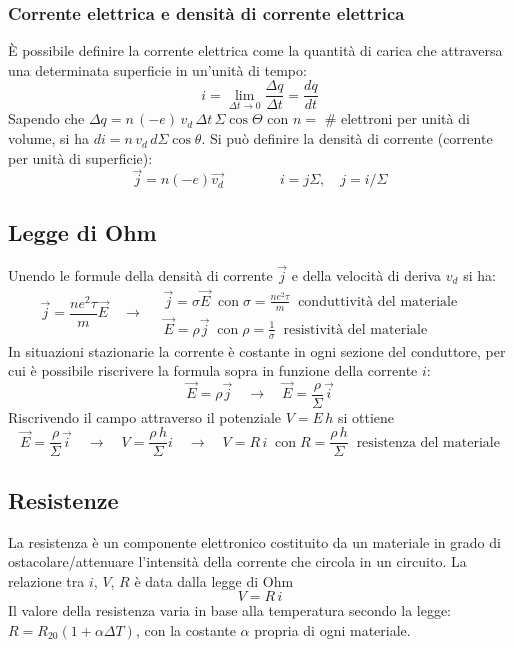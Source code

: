 \documentclass[a4paper]{article}
\begin{document}
\subsubsection*{Corrente elettrica e densità di corrente elettrica}
È possibile definire la corrente elettrica come la quantità di carica che attraversa una determinata superficie in un'unità di tempo:
\[i = \lim_{\Delta t \to 0} \frac{\Delta q}{\Delta t} = \frac{dq}{dt}\]
Sapendo che \(\Delta q = n \, (-e) \, v_d \, \Delta t \, \Sigma \cos \Theta\) con \(n =\) \# elettroni per unità di volume, si ha
\(di = n \, v_d \, d\Sigma \cos \theta\).
Si può definire la densità di corrente (corrente per unità di superficie):
\[\vec{j} = n (-e) \vec{v_d} \qquad \qquad i = j \Sigma, \quad j = i / \Sigma\]

\newpage

\subsection{Legge di Ohm}
Unendo le formule della densità di corrente \(\vec{j}\) e della velocità di deriva \(v_d\) si ha:
\[\vec{j} = \frac{n e^2 \tau}{m} \vec{E} \quad \rightarrow \quad \begin{matrix}
	\vec{j} = \sigma \vec{E} \;\; \text{con} \; \sigma = \frac{n e^2 \tau}{m} \;\; \text{conduttività del materiale} \\[10pt]
	\vec{E} = \rho \vec{j} \;\; \text{con} \; \rho = \frac{1}{\sigma} \;\; \text{resistività del materiale} \qquad \quad \,\,
\end{matrix}\]
In situazioni stazionarie la corrente è costante in ogni sezione del conduttore, per cui è possibile riscrivere la formula sopra
in funzione della corrente \(i\):
\[\vec{E} = \rho \vec{j} \quad \rightarrow \quad \vec{E} = \frac{\rho}{\Sigma} \vec{i}\]
Riscrivendo il campo attraverso il potenziale \(V = E \, h\) si ottiene
\[\vec{E} = \frac{\rho}{\Sigma} \vec{i} \quad \rightarrow \quad V = \frac{\rho \, h}{\Sigma} i  \quad \rightarrow \quad V = R \, i \;\; \text{con} \; R = \frac{\rho \, h}{\Sigma} \;\; \text{resistenza del materiale}\]

\subsection{Resistenze}
La resistenza è un componente elettronico costituito da un materiale in grado di ostacolare/attenuare l'intensità della corrente
che circola in un circuito. La relazione tra \(i\), \(V\), \(R\) è data dalla legge di Ohm \[V = R \, i\]
Il valore della resistenza varia in base alla temperatura secondo la legge: \(R = R_{20} (1 + \alpha \Delta T)\), con la costante
\(\alpha\) propria di ogni materiale.
\end{document}
